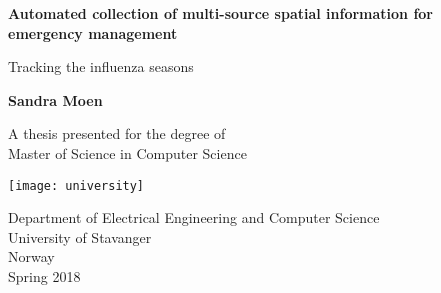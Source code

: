 \begin{titlepage}
	\begin{center}
		\vspace*{1cm}
		
		\Huge
		\textbf{Automated collection of multi-source spatial information for emergency management}
		
		\vspace{0.5cm}
		\LARGE
		Tracking the influenza seasons
		
		\vspace{1.5cm}
		
		\textbf{Sandra Moen}
		
		\vfill
		
		A thesis presented for the degree of \\
		Master of Science in Computer Science
		
		\vspace{0.8cm}
		
		\texttt{[image: university]}
		
		\vspace{0.8cm}
		
		\LARGE
		Department of Electrical Engineering and Computer Science\\
		University of Stavanger\\
		Norway\\
		Spring 2018
		
	\end{center}
\end{titlepage}